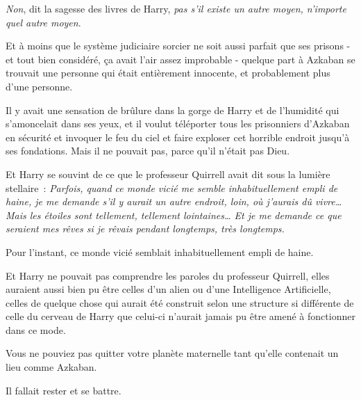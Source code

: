 \emph{Non}, dit la sagesse des livres de Harry, \emph{pas s'il existe un autre moyen, n'importe quel autre moyen}.

Et à moins que le système judiciaire sorcier ne soit aussi parfait que ses prisons - et tout bien considéré, ça avait l'air assez improbable - quelque part à Azkaban se trouvait une personne qui était entièrement innocente, et probablement plus d'une personne.

Il y avait une sensation de brûlure dans la gorge de Harry et de l'humidité qui s'amoncelait dans ses yeux, et il voulut téléporter tous les prisonniers d'Azkaban en sécurité et invoquer le feu du ciel et faire exploser cet horrible endroit jusqu'à ses fondations. Mais il ne pouvait pas, parce qu'il n'était pas Dieu.

Et Harry se souvint de ce que le professeur Quirrell avait dit sous la lumière stellaire~: \emph{Parfois, quand ce monde vicié me semble inhabituellement empli de haine, je me demande s'il y aurait un autre endroit, loin, où j'aurais dû vivre… Mais les étoiles sont tellement, tellement lointaines… Et je me demande ce que seraient mes rêves si je rêvais pendant longtemps, très longtemps.}

Pour l'instant, ce monde vicié semblait inhabituellement empli de haine.

Et Harry ne pouvait pas comprendre les paroles du professeur Quirrell, elles auraient aussi bien pu être celles d'un alien ou d'une Intelligence Artificielle, celles de quelque chose qui aurait été construit selon une structure si différente de celle du cerveau de Harry que celui-ci n'aurait jamais pu être amené à fonctionner dans ce mode.

Vous ne pouviez pas quitter votre planète maternelle tant qu'elle contenait un lieu comme Azkaban.

Il fallait rester et se battre. 

